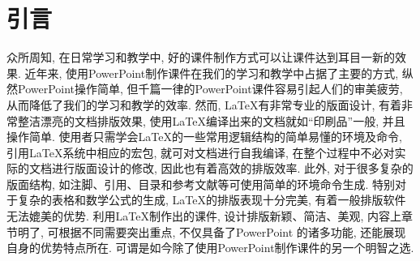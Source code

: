 \section{引言}
    众所周知, 在日常学习和教学中, 好的课件制作方式可以让课件达到耳目一新的效果. 近年来, 使用PowerPoint制作课件在我们的学习和教学中占据了主要的方式, 纵然PowerPoint操作简单, 但千篇一律的PowerPoint课件容易引起人们的审美疲劳, 从而降低了我们的学习和教学的效率. 然而, \LaTeX{}有非常专业的版面设计, 有着非常整洁漂亮的文档排版效果, 使用\LaTeX{}编译出来的文档就如“印刷品”一般, 并且操作简单. 使用者只需学会\LaTeX{}的一些常用逻辑结构的简单易懂的环境及命令, 引用\LaTeX{}系统中相应的宏包, 就可对文档进行自我编译, 在整个过程中不必对实际的文档进行版面设计的修改, 因此也有着高效的排版效率. 此外, 对于很多复杂的版面结构, 如注脚、引用、目录和参考文献等可使用简单的环境命令生成. 特别对于复杂的表格和数学公式的生成, \LaTeX{}的排版表现十分完美, 有着一般排版软件无法媲美的优势. 利用\LaTeX{}制作出的课件, 设计排版新颖、简洁、美观, 内容上章节明了, 可根据不同需要突出重点, 不仅具备了PowerPoint 的诸多功能, 还能展现自身的优势特点所在. 可谓是如今除了使用PowerPoint制作课件的另一个明智之选.
